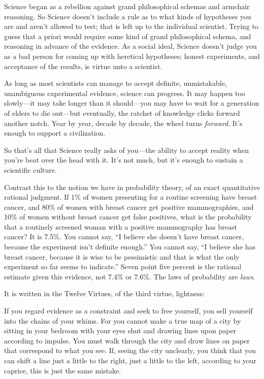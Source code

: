 {
 Science began as a rebellion against grand philosophical schemas
and armchair reasoning. So Science doesn't include a
rule as to what kinds of hypotheses you are and aren't
allowed to test; that is left up to the individual scientist. Trying to
guess that a priori would require some kind of grand philosophical
schema, and reasoning in advance of the evidence. As a social ideal,
Science doesn't judge you as a bad person for coming up
with heretical hypotheses; honest experiments, and acceptance of the
results, is virtue unto a scientist.}

{
 As long as most scientists can manage to accept definite,
unmistakable, unambiguous experimental evidence, science can progress.
It may happen too slowly---it may take longer than it should---you may
have to wait for a generation of elders to die out---but eventually,
the ratchet of knowledge clicks forward another notch. Year by year,
decade by decade, the wheel turns \textit{forward}.
It's enough to support a civilization.}

{
 So that's all that Science really asks of
you---the ability to accept reality when you're beat
over the head with it. It's not much, but
it's enough to sustain a scientific culture.}

{
 Contrast this to the notion we have in probability theory, of an
exact quantitative rational judgment. If 1\% of women presenting for a
routine screening have breast cancer, and 80\% of women with breast
cancer get positive mammographies, and 10\% of women without breast
cancer get false positives, what is the probability that a routinely
screened woman with a positive mammography has breast cancer? It is
7.5\%. You cannot say, ``I believe she
doesn't have breast cancer, because the experiment
isn't definite enough.'' You cannot
say, ``I believe she has breast cancer, because it is
wise to be pessimistic and that is what the only experiment so far
seems to indicate.'' Seven point five percent is the
rational estimate given this evidence, not 7.4\% or 7.6\%. The laws of
probability are \textit{laws}.}

{
 It is written in the Twelve Virtues, of the third virtue,
lightness:}

{
 If you regard evidence as a constraint and seek to free yourself,
you sell yourself into the chains of your whims. For you cannot make a
true map of a city by sitting in your bedroom with your eyes shut and
drawing lines upon paper according to impulse. You must walk through
the city and draw lines on paper that correspond to what you see. If,
seeing the city unclearly, you think that you can shift a line just a
little to the right, just a little to the left, according to your
caprice, this is just the same mistake.}

